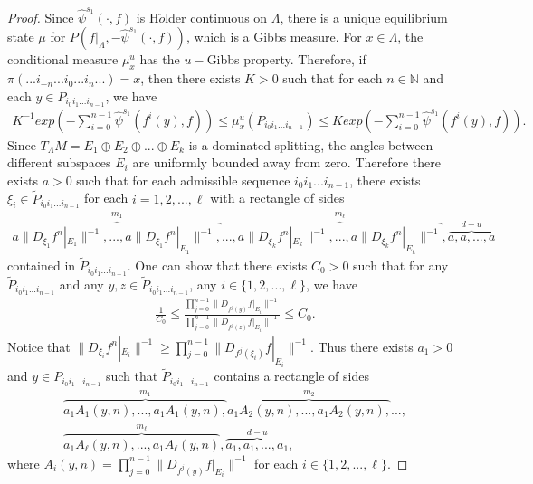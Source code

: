 \documentclass[11pt,a4paper]{amsart}
\theoremstyle{plain}
\theoremstyle{remark}
\begin{document}
\begin{proof}
		Since $\hat{\psi}^{s_{1}}(\cdot,f)$ is H$\ddot{o}$lder continuous on $\Lambda$, there is a unique equilibrium state $\mu$ for $P(f|_{\Lambda},-\hat{\psi}^{s_{1}}(\cdot,f))$, which is a Gibbs measure. For $x\in\Lambda$, the conditional measure
		$\mu_{x}^{u}$ has the $u-$Gibbs property. Therefore, if $\pi(...i_{-n}...i_{0}...i_{n}...)=x$, then there exists $K>0$ such that for each $n\in \mathbb{N}$ and each $y\in P_{i_{0}i_{1}...i_{n-1}}$, we have
		\begin{align*}
			K^{-1}exp(-\sum_{i=0}^{n-1}\hat{\psi}^{s_{1}}(f^{i}(y),f))\leq \mu_{x}^{u}(P_{i_{0}i_{1}...i_{n-1}})\leq K exp(-\sum_{i=0}^{n-1}\hat{\psi}^{s_{1}}(f^{i}(y),f)).
		\end{align*}
		Since $T_{\Lambda}M=E_{1}\oplus E_{2}\oplus...\oplus E_{k}$ is a dominated splitting, the angles between different subspaces $E_{i}$ are uniformly bounded away from zero. Therefore there exists $a>0$ such that for each admissible sequence $i_{0}i_{1}...i_{n-1}$, there exists $\xi_{i}\in \tilde{P}_{i_{0}i_{1}...i_{n-1}}$ for each $i=1,2,...,\ell$ with a rectangle of sides
		\begin{align*}
			\overbrace{a\|D_{\xi_{1}}f^{n}|_{E_{1}}\|^{-1},...,a\|D_{\xi_{1}}f^{n}|_{E_{1}}\|^{-1},}^{m_{1}}...,\overbrace{a\|D_{\xi_{k}}f^{n}|_{E_{k}}\|^{-1},...,a\|D_{\xi_{k}}f^{n}|_{E_{k}}\|^{-1}}^{m_{\ell}},\overbrace{a,a,...,a}^{d-u}
		\end{align*}
		contained in $\tilde{P}_{i_{0}i_{1}...i_{n-1}}$. One can show that there exists $C_{0}>0$ such that for any $\tilde{P}_{i_{0}i_{1}...i_{n-1}}$ and any $y, z \in \tilde{P}_{i_{0}i_{1}...i_{n-1}}$, any $i\in \{1,2,...,\ell\}$, we have
		\begin{align*}
			\frac{1}{C_{0}}\leq \frac{\prod_{j=0}^{n-1}\|D_{f^{j}(y)}f|_{E_{i}}\|^{-1}}{\prod_{j=0}^{n-1}\|D_{f^{j}(z)}f|_{E_{i}}\|^{-1}}\leq C_{0}.
		\end{align*}
		Notice that $\|D_{\xi_{i}}f^{n}|_{E_{i}}\|^{-1}\geq \prod_{j=0}^{n-1}\|D_{f^{j}(\xi_{i})}f|_{E_{i}}\|^{-1}$. Thus there exists $a_{1}>0$ and $y\in P_{i_{0}i_{1}...i_{n-1}}$ such that $\tilde{P}_{i_{0}i_{1}...i_{n-1}}$ contains a rectangle of sides
		\begin{align*}
			\overbrace{a_{1}A_{1}(y,n),...,a_{1}A_{1}(y,n),}^{m_{1}}\overbrace{a_{1}A_{2}(y,n),...,a_{1}A_{2}(y,n),}^{m_{2}}...,\\
			\overbrace{a_{1}A_{\ell}(y,n),...,a_{1}A_{\ell}(y,n)}^{m_{\ell}},\overbrace{a_{1},a_{1},...,a_{1}}^{d-u},
		\end{align*}
		where $A_{i}(y,n)=\prod_{j=0}^{n-1}\|D_{f^{j}(y)}f|_{E_{i}}\|^{-1}$ for each $i\in \{1,2,...,\ell\}$.

\end{proof}
\end{document}
